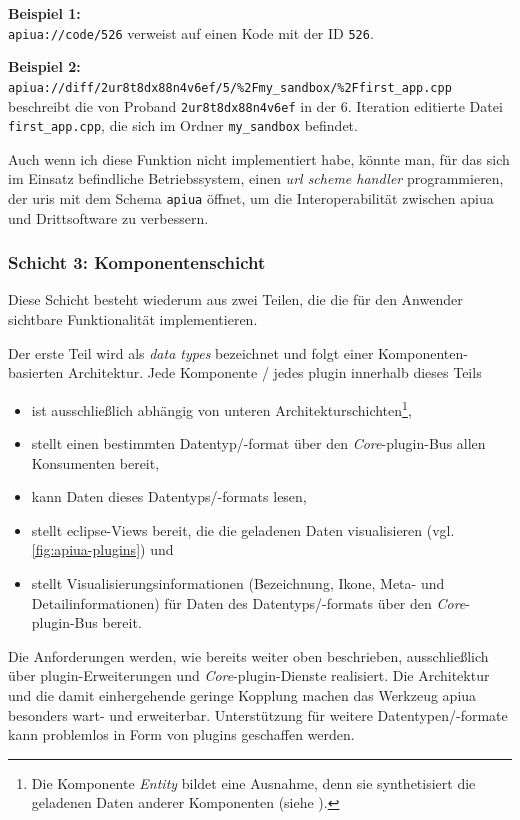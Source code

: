\textbf{Beispiel 1:}\\\texttt{apiua://code/526} verweist auf einen Kode mit der ID \texttt{526}.

\textbf{Beispiel 2:}\\\texttt{apiua://diff/2ur8t8dx88n4v6ef/5/\%2Fmy\_sandbox/\%2Ffirst\_app.cpp} beschreibt die von Proband \texttt{2ur8t8dx88n4v6ef} in der 6. Iteration editierte Datei \texttt{first\_app.cpp}, die sich im Ordner \texttt{my\_sandbox} befindet.

Auch wenn ich diese Funktion nicht implementiert habe, könnte man, für das sich im Einsatz befindliche Betriebssystem, einen \textit{url scheme handler} programmieren, der \glspl{uri} mit dem Schema \texttt{apiua} öffnet, um die Interoperabilität zwischen \gls{apiua} und Drittsoftware zu verbessern.




\subsubsection{Schicht 3: Komponentenschicht}
\label{sec:schicht3}

Diese Schicht besteht wiederum aus zwei Teilen, die die für den Anwender sichtbare Funktionalität implementieren.

Der erste Teil wird als \textit{data types} bezeichnet und folgt einer Komponenten-basierten Architektur. Jede Komponente / jedes \gls{plugin} innerhalb dieses Teils
\begin{itemize}
	\item ist ausschließlich abhängig von unteren Architekturschichten\footnote{Die Komponente \textit{Entity} bildet eine Ausnahme, denn sie synthetisiert die geladenen Daten anderer Komponenten (siehe ).},
	\item stellt einen bestimmten Datentyp/-format über den \textit{Core}-\gls{plugin}-Bus allen Konsumenten bereit,
	\item kann Daten dieses Datentyps/-formats lesen,
	\item stellt \gls{eclipse}-Views bereit, die die geladenen Daten visualisieren (vgl. \autoref{fig:apiua-plugins}) und
	\item stellt Visualisierungsinformationen (Bezeichnung, Ikone, Meta- und Detailinformationen) für Daten des Datentyps/-formats über den \textit{Core}-\gls{plugin}-Bus bereit.
\end{itemize}

Die Anforderungen werden, wie bereits weiter oben beschrieben, ausschließlich über \gls{plugin}-Erweiterungen und \textit{Core}-\gls{plugin}-Dienste realisiert. Die Architektur und die damit einhergehende geringe Kopplung machen das Werkzeug \gls{apiua} besonders wart- und erweiterbar. Unterstützung für weitere Datentypen/-formate kann problemlos in Form von \gls{plugin}s geschaffen werden. 

